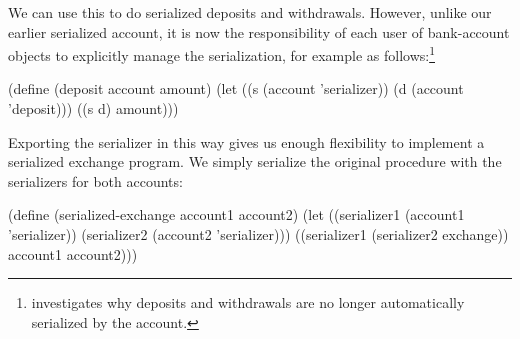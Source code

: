 \noindent
We can use this to do serialized deposits and withdrawals.  However, unlike our
earlier serialized account, it is now the responsibility of each user of
bank-account objects to explicitly manage the serialization, for example as
follows:\footnote{ investigates why deposits and withdrawals
are no longer automatically serialized by the account.}

\begin{codeBlock}
(define (deposit account amount)
  (let ((s (account 'serializer))
        (d (account 'deposit)))
    ((s d) amount)))
\end{codeBlock}

\noindent
Exporting the serializer in this way gives us enough flexibility to implement a
serialized exchange program.  We simply serialize the original 
procedure with the serializers for both accounts:

\begin{codeBlock}
(define (serialized-exchange account1 account2)
  (let ((serializer1 (account1 'serializer))
        (serializer2 (account2 'serializer)))
    ((serializer1 (serializer2 exchange))
     account1
     account2)))
\end{codeBlock}

